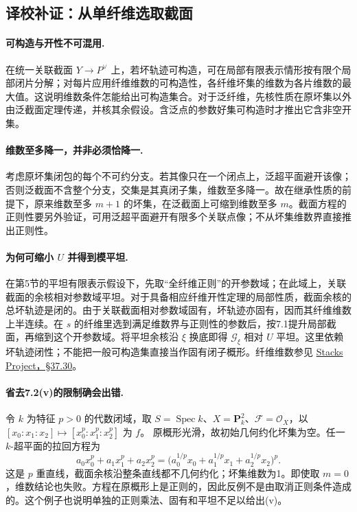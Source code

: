 \documentclass[UTF8,a4paper]{ctexbook}
\newcommand{\OO}{\mathscr O}
\DeclareMathOperator{\Spec}{Spec}
\newcommand{\FF}{\mathcal F}
\newcommand{\GG}{\mathcal G}
\begin{document}
\subsection*{译校补证：从单纤维选取截面}
\paragraph{可构造与开性不可混用.}
在统一关联截面 $Y\to P^\vee$ 上，若坏轨迹可构造，可在局部有限表示情形按有限个局部闭片分解；对每片应用纤维维数的可构造性，各纤维坏集的维数为各片维数的最大值。这说明维数条件怎能给出可构造集合。对于泛纤维，先核性质在原坏集以外由泛截面定理传递，并核其余假设。含泛点的参数好集可构造时才推出它含非空开集。

\paragraph{维数至多降一，并非必须恰降一.}
考虑原坏集闭包的每个不可约分支。若其像只在一个闭点上，泛超平面避开该像；否则泛截面不含整个分支，交集是其真闭子集，维数至多降一。故在继承性质的前提下，原来维数至多 $m+1$ 的坏集，在泛截面上可缩到维数至多 $m$。截面方程的正则性要另外验证，可用泛超平面避开有限多个关联点像；不从坏集维数界直接推出正则性。

\paragraph{为何可缩小 $U$ 并得到模平坦.}
在第5节的平坦有限表示假设下，先取“全纤维正则”的开参数域；在此域上，关联截面的余核相对参数域平坦。对于具备相应纤维开性定理的局部性质，截面余核的总坏轨迹是闭的。由于关联截面相对参数域固有，坏轨迹亦固有，因而其纤维维数上半连续。在 $s$ 的纤维里选到满足维数界与正则性的参数后，按7.1提升局部截面，再缩到这个开参数域。将平坦余核沿 $\xi$ 换底即得 $\GG_\xi$ 相对 $U$ 平坦。这里依赖坏轨迹闭性；不能把一般可构造集直接当作固有闭子概形。纤维维数参见 \href{https://stacks.math.columbia.edu/tag/05F6}{Stacks Project，§37.30}。

\paragraph{省去7.2(v)的限制确会出错.}
令 $k$ 为特征 $p>0$ 的代数闭域，取 $S=\Spec k$、$X=\mathbf P_k^2$、$\FF=\OO_X$，以
$[x_0:x_1:x_2]\mapsto[x_0^p:x_1^p:x_2^p]$ 为 $f$。
原概形光滑，故初始几何约化坏集为空。任一 $k$-超平面的拉回方程为
\[
 a_0x_0^p+a_1x_1^p+a_2x_2^p
   =\bigl(a_0^{1/p}x_0+a_1^{1/p}x_1+a_2^{1/p}x_2\bigr)^p .
\]
这是 $p$ 重直线，截面余核沿整条直线都不几何约化；坏集维数为1。即使取 $m=0$，维数结论也失败。方程在原概形上是正则的，因此反例不是由取消正则条件造成的。这个例子也说明单独的正则乘法、固有和平坦不足以给出(v)。
\end{document}

